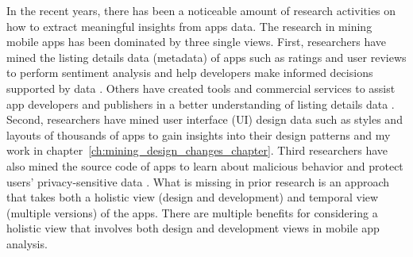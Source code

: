 In the recent years, there has been a noticeable amount of research activities on how to extract meaningful insights from apps data.
The research in mining mobile apps has been dominated by three single views.
First, researchers have mined the listing details data (metadata) of apps such as ratings and user reviews to perform sentiment analysis and help developers make informed decisions supported by data \cite{fu_2013_KDD,chen_2014_ICSE,kong_2015_CCS}. 
Others have created tools and commercial services to assist app developers and publishers in a better understanding of listing details data \cite{appfigures,applause,appannie}.
Second, researchers have mined user interface (UI) design data such as styles and layouts of thousands of apps to gain insights into their design patterns \cite{shirazi_EICS_2013} and my work in chapter~\ref{ch:mining_design_changes_chapter}.
Third researchers have also mined the source code of apps to learn about malicious behavior and protect users' privacy-sensitive data \cite{zhou_2012_SP_dissecting,lu_2012_CCS,Arzt_2014_PLDI}.
What is missing in prior research is an approach that takes both a holistic view (design and development) and temporal view (multiple versions) of the apps.
There are multiple benefits for considering a holistic view that involves both design and development views in mobile app analysis.

